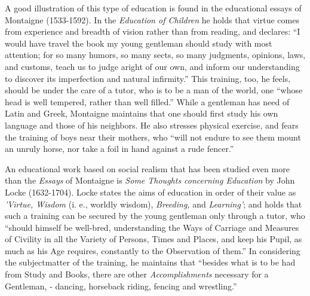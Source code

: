 \documentclass[
]{book}
\begin{document}
A good illustration of this type of education is found in the educational essays of Montaigne (1533-1592). In the \emph{Education of Children} he holds that virtue comes from experience and breadth of vision rather than from reading, and declares: ``I would have travel the book my young gentleman should study with most attention; for so many humors, so many sects, so many judgments, opinions, laws, and customs, teach us to judge aright of our own, and inform our understanding to discover its imperfection and natural infirmity.'' This training, too, he feels, should be under the care of a tutor, who is to be a man of the world, one ``whose head is well tempered, rather than well filled.'' While a gentleman has need of Latin and Greek, Montaigne maintains that one should first study his own language and those of his neighbors. He also stresses physical exercise, and fears the training of boys near their mothers, who ``will not endure to see them mount an unruly horse, nor take a foil in hand against a rude fencer.''

An educational work based on social realism that has been studied even more than the \emph{Essays} of Montaigne is \emph{Some Thoughts concerning Education} by John Locke (1632-1704). Locke states the aims of education in order of their value as \emph{'Virtue, Wisdom} (i. e., worldly wisdom), \emph{Breeding,} and \emph{Learning'}; and holds that such a training can be secured by the young gentleman only through a tutor, who ``should himself be well-bred, understanding the Ways of Carriage and Measures of Civility in all the Variety of Persons, Times and Places, and keep his Pupil, as much as his Age requires, constantly to the Observation of them.'' In considering the subjectmatter of the training, he maintains that ``besides what is to be had from Study and Books, there are other \emph{Accomplishments} necessary for a Gentleman, - dancing, horseback riding, fencing and wrestling.''
\end{document}
